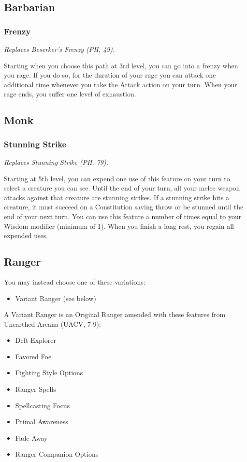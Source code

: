 \documentclass[House_Rules.tex]{subfiles}
\begin{document}
\subsection{Barbarian}

\subsubsection{Frenzy}
\textit{Replaces Beserker's Frenzy (PH, 49).}

Starting when you choose this path at 3rd level, you can go into a frenzy when you rage. If you do so, for the duration of your rage you can attack one additional time whenever you take the Attack action on your turn. When your rage ends, you suffer one level of exhaustion.

\subsection{Monk}
\subsubsection{Stunning Strike}
\textit{Replaces Stunning Strike (PH, 79).}

Starting at 5th level, you can expend one use of this feature on your turn to select a creature you can see. Until the end of your turn, all your melee weapon attacks against that creature are stunning strikes. If a stunning strike hits a creature, it must succeed on a Constitution saving throw or be stunned until the end of your next turn. You can use this feature a number of times equal to your Wisdom modifier (minimum of 1). When you finish a long rest, you regain all expended uses.

\subsection{Ranger}
You may instead choose one of these variations:
\begin{itemize}
    \item Variant Ranger (see below) \label{variantRanger}
\end{itemize}

A Variant Ranger is an Original Ranger amended with these features from Unearthed Arcana (UACV, 7-9):

\begin{itemize}
    \item Deft Explorer
    \item Favored Foe
    \item Fighting Style Options
    \item Ranger Spells
    \item Spellcasting Focus
    \item Primal Awareness
    \item Fade Away
    \item Ranger Companion Options
\end{itemize}
\end{document}

